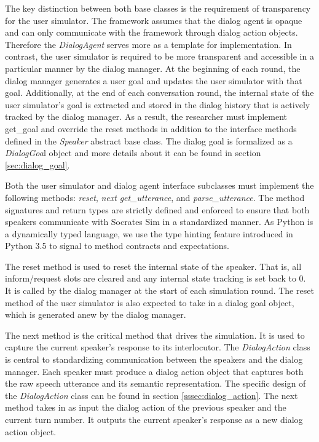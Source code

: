 The key distinction between both base classes is the requirement of transparency for the user simulator. The framework assumes that the dialog agent is opaque and can only communicate with the framework through dialog action objects. Therefore the \textit{DialogAgent} serves more as a template for implementation.  In contrast, the user simulator is required to be more transparent and accessible in a particular manner by the dialog manager. At the beginning of each round, the dialog manager generates a user goal and updates the user simulator with that goal. Additionally, at the end of each conversation round, the internal state of the user simulator's goal is extracted and stored in the dialog history that is actively tracked by the dialog manager. As a result, the researcher must implement get\_goal and override the reset methods in addition to the interface methods defined in the \textit{Speaker} abstract base class. The dialog goal is formalized as a \textit{DialogGoa}l object and more details about it can be found in section \ref{sec:dialog_goal}. 

Both the user simulator and dialog agent interface subclasses must implement the following methods: \textit{reset}, \textit{next} \textit{get\_utterance}, and \textit{parse\_utterance}. The method signatures and return types are strictly defined and enforced to ensure that both speakers communicate with Socrates Sim in a standardized manner. As Python is a dynamically typed language, we use the type hinting feature introduced in Python 3.5 to signal to method contracts and expectations. 

The reset method is used to reset the internal state of the speaker. That is, all inform/request slots are cleared and any internal state tracking is set back to 0. It is called by the dialog manager at the start of each simulation round. The reset method of the user simulator is also expected to take in a dialog goal object, which is generated anew by the dialog manager. 

The next method is the critical method that drives the simulation. It is used to capture the current speaker's response to its interlocutor. The \textit{DialogAction} class is central to standardizing communication between the speakers and the dialog manager. Each speaker must produce a dialog action object that captures both the raw speech utterance and its semantic representation. The specific design of the \textit{DialogAction} class can be found in section \ref{sssec:dialog_action}. The next method takes in as input the dialog action of the previous speaker and the current turn number. It outputs the current speaker's response as a new dialog action object.

